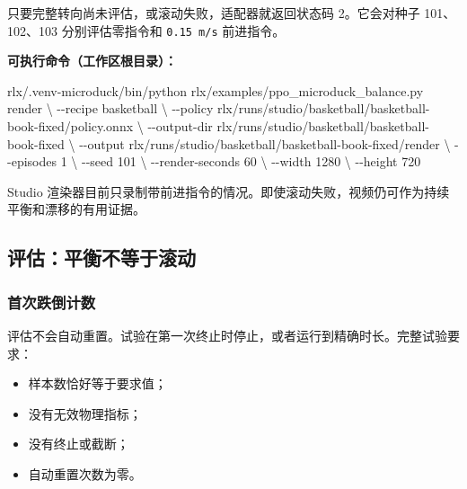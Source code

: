 \documentclass[
  chinese,
  11pt,
  letterpaper,
]{article}
\newenvironment{Shaded}{\begin{snugshade}}{\end{snugshade}}
\newcommand{\AttributeTok}[1]{\textcolor[rgb]{0.13,0.29,0.53}{#1}}
\newcommand{\DataTypeTok}[1]{\textcolor[rgb]{0.13,0.29,0.53}{#1}}
\newcommand{\ExtensionTok}[1]{#1}
\newcommand{\NormalTok}[1]{#1}
\providecommand{\tightlist}{%
  \setlength{\itemsep}{0pt}\setlength{\parskip}{0pt}}
\renewenvironment{Shaded}{\par\smallskip}{\par\smallskip}
\begin{document}
只要完整转向尚未评估，或滚动失败，适配器就返回状态码 2。它会对种子
101、102、103 分别评估零指令和 \texttt{0.15\ m/s} 前进指令。

\textbf{可执行命令（工作区根目录）：}

\begin{Shaded}
\begin{Highlighting}[]
\ExtensionTok{rlx/.venv{-}microduck/bin/python}\NormalTok{ rlx/examples/ppo\_microduck\_balance.py render }\DataTypeTok{\textbackslash{}}
  \AttributeTok{{-}{-}recipe}\NormalTok{ basketball }\DataTypeTok{\textbackslash{}}
  \AttributeTok{{-}{-}policy}\NormalTok{ rlx/runs/studio/basketball/basketball{-}book{-}fixed/policy.onnx }\DataTypeTok{\textbackslash{}}
  \AttributeTok{{-}{-}output{-}dir}\NormalTok{ rlx/runs/studio/basketball/basketball{-}book{-}fixed }\DataTypeTok{\textbackslash{}}
  \AttributeTok{{-}{-}output}\NormalTok{ rlx/runs/studio/basketball/basketball{-}book{-}fixed/render }\DataTypeTok{\textbackslash{}}
  \AttributeTok{{-}{-}episodes}\NormalTok{ 1 }\DataTypeTok{\textbackslash{}}
  \AttributeTok{{-}{-}seed}\NormalTok{ 101 }\DataTypeTok{\textbackslash{}}
  \AttributeTok{{-}{-}render{-}seconds}\NormalTok{ 60 }\DataTypeTok{\textbackslash{}}
  \AttributeTok{{-}{-}width}\NormalTok{ 1280 }\DataTypeTok{\textbackslash{}}
  \AttributeTok{{-}{-}height}\NormalTok{ 720}
\end{Highlighting}
\end{Shaded}

Studio
渲染器目前只录制带前进指令的情况。即使滚动失败，视频仍可作为持续平衡和漂移的有用证据。

\subsection{评估：平衡不等于滚动}\label{ux8bc4ux4f30ux5e73ux8861ux4e0dux7b49ux4e8eux6edaux52a8}

\subsubsection{首次跌倒计数}\label{ux9996ux6b21ux8dccux5012ux8ba1ux6570}

评估不会自动重置。试验在第一次终止时停止，或者运行到精确时长。完整试验要求：

\begin{itemize}
\tightlist
\item
  样本数恰好等于要求值；
\item
  没有无效物理指标；
\item
  没有终止或截断；
\item
  自动重置次数为零。
\end{itemize}
\end{document}
